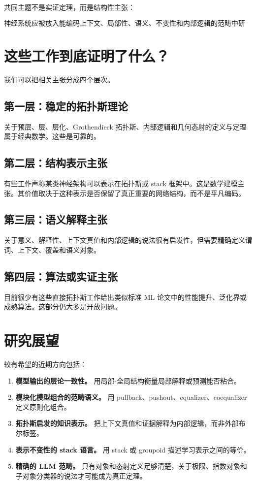 \documentclass[UTF8,11pt,fontset=none]{ctexart}
\begin{document}
共同主题不是实证定理，而是结构性主张：


\[
\text{神经系统应被放入能编码上下文、局部性、语义、不变性和内部逻辑的范畴中研究。}
\]

\section{这些工作到底证明了什么？}

我们可以把相关主张分成四个层次。


\subsection{第一层：稳定的拓扑斯理论}

关于预层、层、层化、Grothendieck 拓扑斯、内部逻辑和几何态射的定义与定理属于经典数学。这些是可靠的。


\subsection{第二层：结构表示主张}

有些工作声称某类神经架构可以表示在拓扑斯或 stack 框架中。这是数学建模主张。其价值取决于这种表示是否保留了真正重要的网络结构，而不是平凡编码。


\subsection{第三层：语义解释主张}

关于意义、解释性、上下文真值和内部逻辑的说法很有启发性，但需要精确定义谓词、上下文、覆盖和语义对象。


\subsection{第四层：算法或实证主张}

目前很少有这些直接拓扑斯工作给出类似标准 ML 论文中的性能提升、泛化界或成熟算法。这部分仍大多是开放问题。


\section{研究展望}

较有希望的近期方向包括：


\begin{enumerate}
\item \textbf{模型输出的层论一致性。} 用局部-全局结构衡量局部解释或预测能否粘合。
\item \textbf{模块化模型组合的范畴语义。} 用 pullback、pushout、equalizer、coequalizer 定义原则化组合。
\item \textbf{拓扑斯启发的知识表示。} 把上下文真值和证据解释为内部逻辑，而非外部布尔标签。
\item \textbf{表示不变性的 stack 语言。} 用 stack 或 groupoid 描述学习表示之间的等价。
\item \textbf{精确的 LLM 范畴。} 只有对象和态射定义足够清楚，关于极限、指数对象和子对象分类器的说法才可能成为真正定理。
\end{enumerate}
\end{document}
